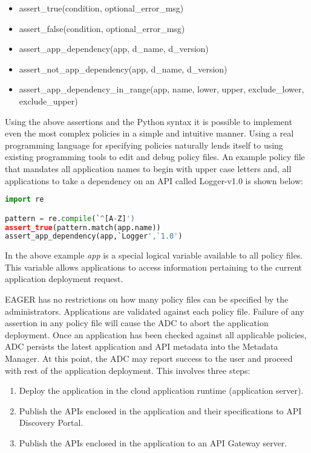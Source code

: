 \begin{itemize}
\item assert\_true(condition, optional\_error\_msg)
\item assert\_false(condition, optional\_error\_msg)
\item assert\_app\_dependency(app, d\_name, d\_version)
\item assert\_not\_app\_dependency(app, d\_name, d\_version)
\item assert\_app\_dependency\_in\_range(app, name, lower, upper, exclude\_lower, exclude\_upper)
\end{itemize}

Using the above assertions and the Python syntax it is possible to implement even the most complex policies in a simple and intuitive manner.
Using a real programming language for specifying policies naturally lends itself to using existing programming tools to edit and debug policy files. An example
policy file that mandates all application names to begin with upper case letters and, all applications to take a dependency on an API called Logger-v1.0
is shown below:

\begin{lstlisting}[language=Python, frame=single]
import re

pattern = re.compile(`^[A-Z]')
assert_true(pattern.match(app.name))
assert_app_dependency(app,`Logger',`1.0')
\end{lstlisting}

In the above example \textit{app} is a special logical variable available to all policy files. This variable allows applications to access information pertaining
to the current application deployment request. 

EAGER has no restrictions on how many policy files can be specified by the administrators. Applications are validated against each policy file. Failure of 
any assertion in any policy file will cause the ADC to abort the application deployment. Once an application has been checked against all applicable 
policies, ADC persists the latest application and API metadata into the Metadata Manager.
At this point, the ADC may report success to the user and proceed with rest of the application deployment. This involves three steps:

\begin{enumerate}
\item Deploy the application in the cloud application runtime (application server).
\item Publish the APIs enclosed in the application and their specifications to API Discovery Portal.
\item Publish the APIs enclosed in the application to an API Gateway server.
\end{enumerate}

